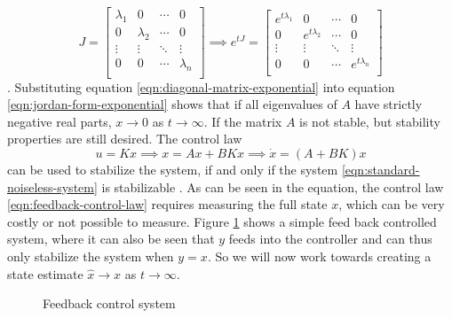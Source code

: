 \begin{equation}\label{eqn:diagonal-matrix-exponential}
    J =
    \begin{bmatrix}
        \lambda_1 & 0 & \cdots & 0 \\
        0 & \lambda_2 & \cdots & 0 \\
        \vdots & \vdots & \ddots & \vdots \\
        0 & 0 & \cdots & \lambda_n \\
    \end{bmatrix} \implies 
    e^{tJ} = 
    \begin{bmatrix}
        e^{t\lambda_1} & 0 & \cdots & 0 \\
        0 & e^{t\lambda_2} & \cdots & 0 \\
        \vdots & \vdots & \ddots & \vdots \\
        0 & 0 & \cdots & e^{t\lambda_n} \\
    \end{bmatrix}
\end{equation}
\cite[Section 7.1]{Hespanha2018LinearTheory}. Substituting equation \eqref{eqn:diagonal-matrix-exponential} into equation \eqref{eqn:jordan-form-exponential} shows that if all eigenvalues of $A$ have strictly negative real parts, $x \rightarrow 0$ as $t \rightarrow \infty$. If the matrix $A$ is not stable, but stability properties are still desired. The control law
\begin{equation}\label{eqn:feedback-control-law}
    u = Kx \implies x = Ax + BKx \implies \dot{x} = (A+BK)x
\end{equation}
can be used to stabilize the system, if and only if the system \eqref{eqn:standard-noiseless-system} is stabilizable \cite[Th. 14.5]{Hespanha2018LinearTheory}. As can be seen in the equation, the control law \eqref{eqn:feedback-control-law} requires measuring the full state $x$, which can be very costly or not possible to measure. Figure \ref{fig:feedback-diagram} shows a simple feed back controlled system, where it can also be seen that $y$ feeds into the controller and can thus only stabilize the system when $y=x$. So we will now work towards creating a state estimate $\hat{x} \rightarrow x$ as $t \rightarrow \infty$.

\begin{figure}[H]
    \centering
    \caption{Feedback control system}
    \label{fig:feedback-diagram}
\end{figure}
 
